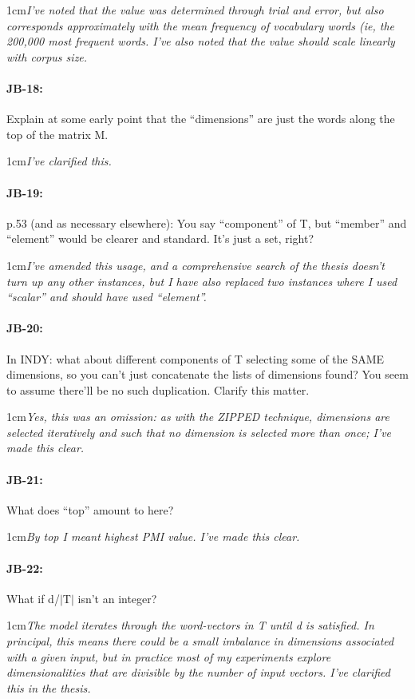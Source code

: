 \documentclass[11pt,a4paper]{article}
\newcommand{\res}[1]{\vspace{0.25cm} \begin{adjustwidth}{1cm}{}\emph{#1}\end{adjustwidth}}
\begin{document}
\res{I've noted that the value was determined through trial and error, but also corresponds approximately with the mean frequency of vocabulary words (ie, the 200,000 most frequent words.  I've also noted that the value should scale linearly with corpus size.}

\paragraph{JB-18:} Explain at some early point that the ``dimensions'' are just the words along the top of the matrix M.

\res{I've clarified this.}

\paragraph{JB-19:} p.53 (and as necessary elsewhere): You say ``component'' of T, but ``member'' and ``element'' would be clearer and standard. It's just a set, right?

\res{I've amended this usage, and a comprehensive search of the thesis doesn't turn up any other instances, but I have also replaced two instances where I used ``scalar'' and should have used ``element''.}

\paragraph{JB-20:} In INDY: what about different components of T selecting some of the SAME dimensions, so you can't just concatenate the lists of dimensions found? You seem to assume there'll be no such duplication. Clarify this matter.

\res{Yes, this was an omission: as with the ZIPPED technique, dimensions are selected iteratively and such that no dimension is selected more than once; I've made this clear.}

\paragraph{JB-21:} What does ``top'' amount to here?

\res{By top I meant highest PMI value.  I've made this clear.}

\paragraph{JB-22:} What if d/$|$T$|$ isn't an integer?

\res{The model iterates through the word-vectors in T until d is satisfied.  In principal, this means there could be a small imbalance in dimensions associated with a given input, but in practice most of my experiments explore dimensionalities that are divisible by the number of input vectors.  I've clarified this in the thesis.}
\end{document}
